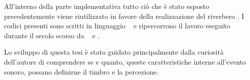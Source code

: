 All'interno della parte implementativa tutto ciò che è stato esposto
precedentemente viene riutilizzato in favore della realizzazione del riverbero
\atmoverb. I codici presenti sono scritti in linguaggio \faust~ e ripercorrono
il lavoro eseguito durante il secolo scorso da \ms~ e \jam.

Lo sviluppo di questa tesi è stato guidato principalmente dalla curiosità
dell’autore di comprendere se e quanto, queste caratteristiche interne all’evento
sonoro, possano definirne il timbro e la percezione.

